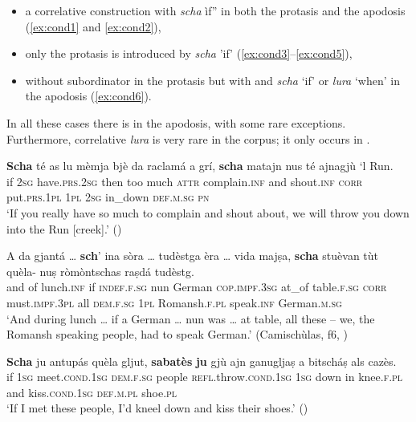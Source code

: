 \begin{itemize}
	\item a correlative construction with \textit{scha} ìf'' in both the protasis and the apodosis (\ref{ex:cond1} and \ref{ex:cond2}), 
	\item only the protasis is introduced by \textit{scha} 'if' (\ref{ex:cond3}--\ref{ex:cond5}),
	\item without subordinator in the protasis but with  and \textit{scha} `if' or \textit{lura} `when' in the apodosis (\ref{ex:cond6}).
\end{itemize}

In all these cases there is  in the apodosis, with some rare exceptions. Furthermore, correlative \textit{lura} is very rare in the corpus; it only occurs in \citet{Büchli1966}.

\ea
\label{ex:cond1}
\gll \textbf{Scha} té as lu mèmja bjè da raclamá a grí, \textbf{scha} matajn nus té ajnagjù ‘l Run.\\
if \textsc{2sg} have.\textsc{prs.2sg} then too much \textsc{attr} complain.\textsc{inf} and shout.\textsc{inf} \textsc{corr} put.\textsc{prs.1pl} \textsc{1pl} \textsc{2sg} in\_down \textsc{def.m.sg} \textsc{pn}\\
\glt `If you really have so much to complain and shout about, we will throw you down into the Run [creek].' (\citealt[120]{Berther1998})
\z

\ea
\label{ex:cond2}
\gll    A da gjantá … \textbf{sch}’ ina sòra … tudèstga èra … vida majṣa, \textbf{scha} stuèvan tùt quèla- nuṣ ròmòntschas raṣdá tudèstg.\\
and of lunch.\textsc{inf} {} if \textsc{indef.f.sg} nun {} German \textsc{cop.impf.3sg} {} at\_of table.\textsc{f.sg} \textsc{corr} must.\textsc{impf.3pl} all \textsc{dem.f.sg} \textsc{1pl} Romansh.\textsc{f.pl} speak.\textsc{inf} German.\textsc{m.sg}\\
\glt `And during lunch … if a German … nun was … at table, all these – we, the Romansh speaking people, had to speak German.' (Camischùlas, f6, )
\z

\ea
\label{ex:cond3}
\gll \textbf{Scha} ju antupás quèla gljut, \textbf{sabatès} \textbf{ju} gjù ajn ganugljaṣ a bitscháṣ als cazès.\\
if \textsc{1sg} meet.\textsc{cond.1sg} \textsc{dem.f.sg} people \textsc{refl}.throw.\textsc{cond.1sg} \textsc{1sg} down in knee.\textsc{f.pl} and kiss.\textsc{cond.1sg} \textsc{def.m.pl} shoe.\textsc{pl}\\
\glt `If I met these people, I’d kneel down and kiss their shoes.' (\citealt[60]{Berther1998})
\z

